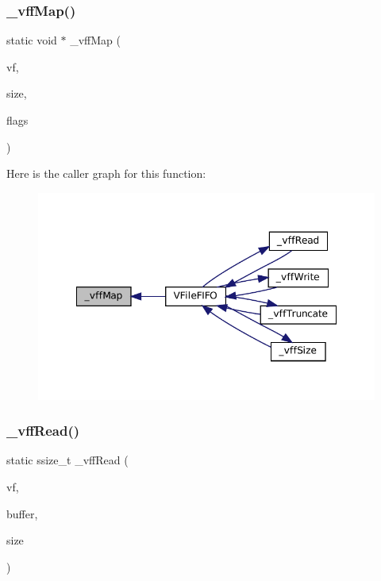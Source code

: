 \subsubsection{\texorpdfstring{\+\_\+vff\+Map()}{\_vffMap()}}
{\footnotesize\ttfamily static void $\ast$ \+\_\+vff\+Map (\begin{DoxyParamCaption}\item[{struct V\+File $\ast$}]{vf,  }\item[{size\+\_\+t}]{size,  }\item[{\mbox{\hyperlink{ioapi_8h_a787fa3cf048117ba7123753c1e74fcd6}{int}}}]{flags }\end{DoxyParamCaption})\hspace{0.3cm}{\ttfamily [static]}}

Here is the caller graph for this function\+:
\nopagebreak
\begin{figure}[H]
\begin{center}
\leavevmode
\includegraphics[width=348pt]{vfs-fifo_8c_ae264af80ce9f8d7e855924166bbe3866_icgraph}
\end{center}
\end{figure}
\mbox{\label{vfs-fifo_8c_aebf7afd08be7a4e51c2ae0f17dde12f8}} 
\subsubsection{\texorpdfstring{\+\_\+vff\+Read()}{\_vffRead()}}
{\footnotesize\ttfamily static ssize\+\_\+t \+\_\+vff\+Read (\begin{DoxyParamCaption}\item[{struct V\+File $\ast$}]{vf,  }\item[{void $\ast$}]{buffer,  }\item[{size\+\_\+t}]{size }\end{DoxyParamCaption})\hspace{0.3cm}{\ttfamily [static]}}

